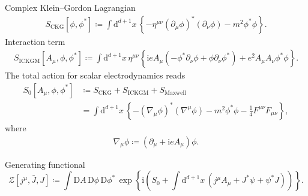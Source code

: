 \documentclass[12pt]{article}
\newcommand\mi{\mathrm{i}} %
\newcommand\dif{\mathrm{d}}
\newcommand\Dif{\mathrm{D}}
\newcommand{\rbr}[1]{{\left(#1\right)}}
\newcommand{\cbr}[1]{{\left\{#1\right\}}}
\newcommand{\sfun}[2]{{#1}\mathopen{}\left[#2\right]\mathclose{}}
\newcommand{\cfun}[2]{{#1}\mathopen{}\left\{#2\right\}\mathclose{}}
\begin{document}
Complex Klein--Gordon Lagrangian
\begin{align}
\sfun{S_\text{CKG}}{\phi,\phi^*}\coloneqq\int\dif^{d+1}x\,\cbr{-\eta^{\mu\nu}
\rbr{\partial_\mu\phi}^* \rbr{\partial_\nu\phi} - m^2\phi^*\phi}.
\end{align}
Interaction term
\begin{align}
\sfun{S_\text{ICKGM}}{A_\mu,\phi,\phi^*} \coloneqq \int\dif^{d+1}x\,
\eta^{\mu\nu}{}
\cbr{\mi e A_\mu \rbr{-\phi^*\partial_\nu\phi+\phi\partial_\nu\phi^*}
+e^2 A_\mu A_\nu \phi^* \phi}.
\end{align}
The total action for scalar electrodynamics reads
\begin{align}
\sfun{S_0}{A_\mu, \phi, \phi^*} &\coloneqq 
S_\text{CKG} + S_\text{ICKGM} + S_\text{Maxwell} \nonumber \\
&= \int\dif^{d+1}x\,\cbr{-\rbr{\nabla_\mu\phi}^* \rbr{\nabla^\mu\phi} - 
m^2\phi^*\phi -\frac{1}{4}F^{\mu\nu}F_{\mu\nu}},
\end{align}
where
\begin{align}
\nabla_\mu\phi \coloneqq \rbr{\partial_\mu+\mi e A_\mu}\phi.
\end{align}

Generating functional
\begin{equation}
\sfun{\mathcal{Z}}{j^\mu, \bar J, J} \coloneqq
\int\Dif A\,\Dif\phi\,\Dif\phi^*\,\cfun{\exp}{\mi\rbr{S_0
+\int\dif^{d+1} x\,\rbr{j^\mu A_\mu + J^* \psi+\psi^* J}}}.
\end{equation}
\end{document}

